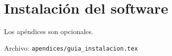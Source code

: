 
\chapter{Instalación del software}\label{ap:apendice1}

Los apéndices son opcionales.

Archivo: \texttt{apendices/guia\_instalacion.tex}

\endinput
